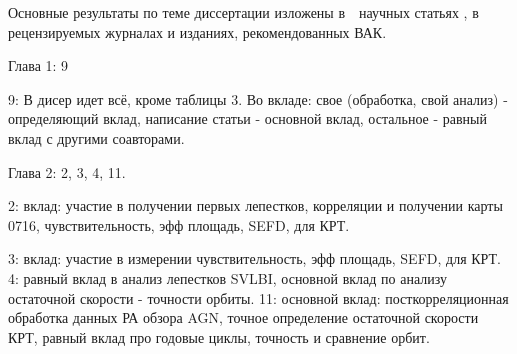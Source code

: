     \ifsynopsis
    \fi

Основные результаты по теме диссертации изложены в~~научных статьях
\cite{Voitsik_2018, Kardashev_2013_rus, Kovalev_2014_rus, Lobanov_2015, Kutkin_2018}, в
рецензируемых журналах и изданиях, рекомендованных ВАК.

\insertbiblioauthor

{\contribution}

Глава 1: 9

9: В дисер идет всё, кроме таблицы 3.
Во вкладе: свое (обработка, свой анализ) - определяющий вклад, написание статьи - основной вклад,
остальное - равный вклад  с другими соавторами.

Глава 2: 2, 3, 4, 11.

2: вклад: участие в получении первых лепестков, корреляции и получении карты 0716, чувствительность,
эфф площадь, SEFD, для КРТ.

3: вклад: участие в измерении чувствительность, эфф площадь, SEFD, для КРТ.
4: равный вклад в анализ лепестков SVLBI, основной вклад по анализу остаточной скорости - точности
орбиты.
11: основной вклад: посткорреляционная обработка данных РА обзора AGN, точное определение остаточной
скорости КРТ, равный вклад про годовые циклы, точность и сравнение орбит.

